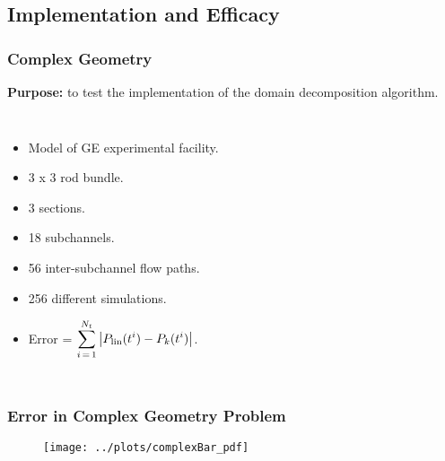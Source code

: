 \documentclass[compress,xcolor=table]{beamer}
\begin{document}
\subsection[Implementation \& Efficacy]{Implementation and Efficacy}
\begin{frame}
\frametitle{Complex Geometry}

\textbf{Purpose:} to test the implementation of the domain decomposition algorithm.

\begin{columns}

\begin{itemize}
\item{Model of GE experimental facility.}
\item{3 x 3 rod bundle.}
\item{3 sections.}
\item{18 subchannels.}
\item{56 inter-subchannel flow paths.}
\item{256 different simulations.}
\item{Error = $\displaystyle \sum_{i\,=\,1}^{N_{t}} \left|P_{\text{lin}}(t^{i}) -P_{k}(t^{i})\right|$.}
\end{itemize}


\begin{figure}[h!t]
\centering
\resizebox{\textwidth}{!}{

}
\end{figure}

\end{columns}
\end{frame}
\begin{frame}
\frametitle{Error in Complex Geometry Problem}

\begin{figure}[h!t]
\centering
\texttt{[image: ../plots/complexBar\_pdf]}
\end{figure}


\end{frame}
\end{document}
